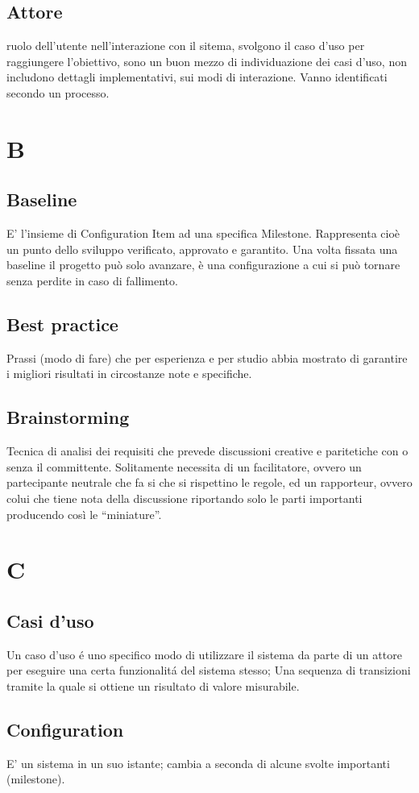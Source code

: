 \documentclass[a4paper]{report}
\newcommand{\mychapter}[2]{
	\setcounter{chapter}{#1}
	\setcounter{section}{0}
	\setcounter{subsection}{1}
	\chapter*{#2}
	\addcontentsline{toc}{chapter}{#2}
}
\begin{document}
\section{Attore} ruolo dell'utente nell'interazione con il sitema, svolgono il caso d'uso per raggiungere l'obiettivo, sono un buon mezzo di individuazione dei casi d'uso, non includono dettagli implementativi, sui modi di interazione. Vanno identificati secondo un processo.

\mychapter{2}{B}

\section{Baseline} E' l'insieme di Configuration Item ad una specifica Milestone. Rappresenta cioè un punto dello sviluppo verificato, approvato e garantito. Una volta fissata una baseline il progetto può solo avanzare, è una configurazione a cui si può tornare senza perdite in caso di fallimento.
\section{Best practice} Prassi (modo di fare) che per esperienza e per studio abbia mostrato di garantire i migliori risultati in circostanze note e specifiche. 
\section{Brainstorming} Tecnica di analisi dei requisiti che prevede discussioni creative e paritetiche con o senza il committente. Solitamente necessita di un facilitatore, ovvero un partecipante neutrale che fa si che si rispettino le regole, ed un rapporteur, ovvero colui che tiene nota della discussione riportando solo le parti importanti producendo così le “miniature”.

\mychapter{3}{C}

\section{Casi d'uso} Un caso d'uso é uno specifico modo di utilizzare il sistema da parte di un attore per eseguire una certa funzionalitá del sistema stesso; Una sequenza di transizioni tramite la quale si ottiene un risultato di valore misurabile.
\section{Configuration} E' un sistema in un suo istante; cambia a seconda di alcune svolte importanti (milestone).
\end{document}
